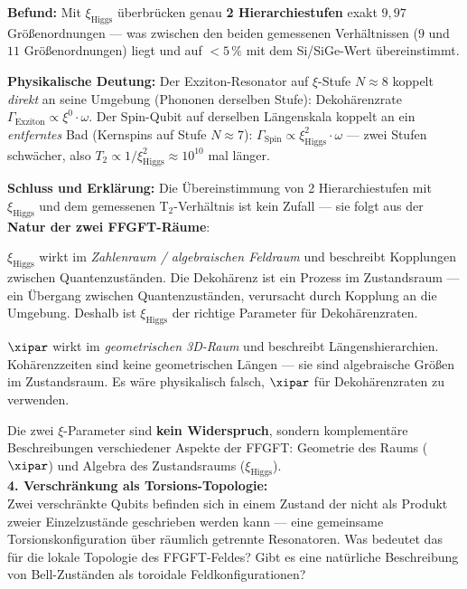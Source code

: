 \begin{significance}
\textbf{Befund:} Mit $\xi_\text{Higgs}$ überbrücken genau \textbf{2 Hierarchiestufen}
exakt $9{,}97$ Größenordnungen --- was zwischen den beiden
gemessenen Verhältnissen ($9$ und $11$ Größenordnungen) liegt
und auf $< 5\,\%$ mit dem Si/SiGe-Wert übereinstimmt.

\textbf{Physikalische Deutung:}
Der Exziton-Resonator auf $\xi$-Stufe $N \approx 8$ koppelt
\emph{direkt} an seine Umgebung (Phononen derselben Stufe):
Dekohärenzrate $\Gamma_\text{Exziton} \propto \xi^0 \cdot \omega$.
Der Spin-Qubit auf derselben Längenskala koppelt an ein
\emph{entferntes} Bad (Kernspins auf Stufe $N \approx 7$):
$\Gamma_\text{Spin} \propto \xi_\text{Higgs}^2 \cdot \omega$ ---
zwei Stufen schwächer, also $T_2 \propto 1/\xi_\text{Higgs}^2
\approx 10^{10}$ mal länger.

\textbf{Schluss und Erklärung:}
Die Übereinstimmung von 2 Hierarchiestufen mit $\xi_\text{Higgs}$ und
dem gemessenen T$_2$-Verhältnis ist kein Zufall ---
sie folgt aus der \textbf{Natur der zwei FFGFT-Räume}:

$\xi_\text{Higgs}$ wirkt im \emph{Zahlenraum / algebraischen Feldraum}
und beschreibt Kopplungen zwischen Quantenzuständen.
Die Dekohärenz ist ein Prozess im Zustandsraum ---
ein Übergang zwischen Quantenzuständen, verursacht durch
Kopplung an die Umgebung.
Deshalb ist $\xi_\text{Higgs}$ der richtige Parameter für Dekohärenzraten.

$\xipar$ wirkt im \emph{geometrischen 3D-Raum}
und beschreibt Längenshierarchien.
Kohärenzzeiten sind keine geometrischen Längen ---
sie sind algebraische Größen im Zustandsraum.
Es wäre physikalisch falsch, $\xipar$ für Dekohärenzraten zu verwenden.

Die zwei $\xi$-Parameter sind \textbf{kein Widerspruch},
sondern komplementäre Beschreibungen verschiedener Aspekte der FFGFT:
Geometrie des Raums ($\xipar$) und Algebra des Zustandsraums ($\xi_\text{Higgs}$).\\[6pt]

\textbf{4. Verschränkung als Torsions-Topologie:}\\
Zwei verschränkte Qubits befinden sich in einem Zustand
der nicht als Produkt zweier Einzelzustände geschrieben
werden kann --- eine gemeinsame Torsionskonfiguration
über räumlich getrennte Resonatoren.
Was bedeutet das für die lokale Topologie
des FFGFT-Feldes?
Gibt es eine natürliche Beschreibung von Bell-Zuständen
als toroidale Feldkonfigurationen?
\end{significance}

